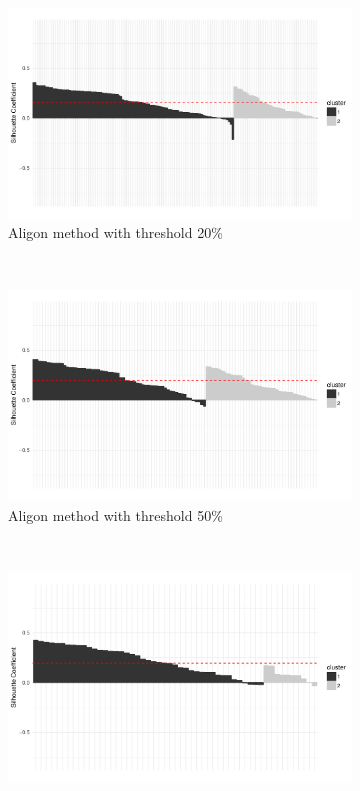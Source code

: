 \begin{figure}[h!]
	\captionsetup[subfigure]{justification=centering}
    \centering
    \begin{subfigure}[b]{0.322\textwidth}%
        \centering
        \includegraphics[width=\textwidth]{graphics/sil_ub_aligon_0.2.pdf}
        \caption{Aligon method with threshold 20\%}
    \end{subfigure}%
    ~
    \begin{subfigure}[b]{0.322\textwidth}%
        \centering
        \includegraphics[width=\textwidth]{graphics/sil_ub_aligon_0.5.pdf}
        \caption{Aligon method with threshold 50\%}
    \end{subfigure}
    ~
    \begin{subfigure}[b]{0.322\textwidth}%
        \centering
        \includegraphics[width=\textwidth]{graphics/sil_ub_aligon_0.8.pdf}

\end{subfigure}
\end{figure}
